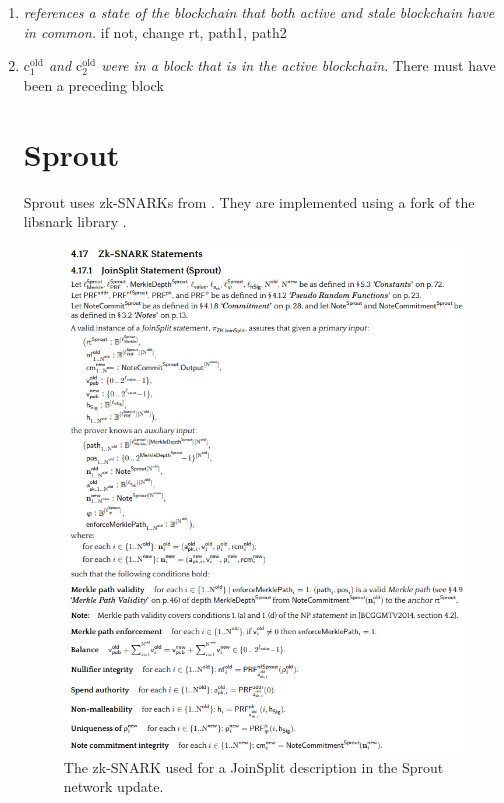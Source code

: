 \documentclass{article}
\begin{document}
\begin{enumerate}
        \item \textit{ references a state of the blockchain that both active and stale blockchain have in common.}
                if not, change rt, path1, path2
        \item \textit{$\text{c}_1^\text{old}$ and $\text{c}_2^\text{old}$ were in a block that is in the active blockchain.}
                There must have been a preceding block %

\section{Sprout}

Sprout uses zk-SNARKs from \cite{bensasson:zksnark}. They are implemented using a fork of the libsnark library \cite{zcash:libsnark}.

\begin{figure}[t]
\includegraphics[width=\textwidth]{joinsplit-zksnark.png}
\caption{The zk-SNARK used for a JoinSplit description in the Sprout network update. \cite{hopwood:zcash}}
\centering
\end{figure}


\end{enumerate}
\end{document}
